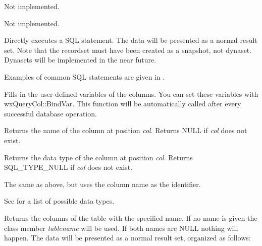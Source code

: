 

Not implemented.



Not implemented.

\label{wxrecordsetexecutesql}


Directly executes a SQL statement. The data will be presented as a normal
result set. Note that the recordset must have been created as a snapshot, not
dynaset. Dynasets will be implemented in the near future.

Examples of common SQL statements are given in .



Fills in the user-defined variables of the columns. You can set these
variables with wxQueryCol::BindVar. This function will be automatically
called after every successful database operation.



Returns the name of the column at position {\it col}. Returns NULL if {\it col} does not
exist.



Returns the data type of the column at position {\it col}. Returns SQL\_TYPE\_NULL
if {\it col} does not exist.


The same as above, but uses the column name as the identifier.

See  for a list
of possible data types.



Returns the columns of the table with the specified name. If no name is
given the class member {\it tablename} will be used. If both names are NULL
nothing will happen. The data will be presented as a normal result set, organized
as follows:

